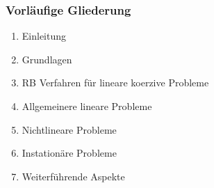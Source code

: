 \subsubsection*{Vorläufige Gliederung}
\label{Vorläufige Gliederung}

\begin{enumerate}[1]
	\item Einleitung
	\item Grundlagen
	\item RB Verfahren für lineare koerzive Probleme
	\item Allgemeinere lineare Probleme
	\item Nichtlineare Probleme
	\item Instationäre Probleme
	\item Weiterführende Aspekte
\end{enumerate}